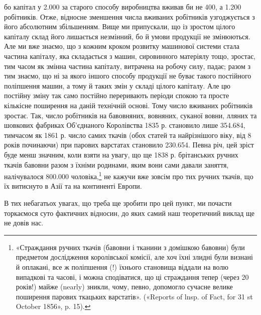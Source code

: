 \parcont{}  %
бо капітал у 2.000 за старого способу виробництва
вживав би не 400, а 1.200 робітників. Отже, відносне зменшення
числа вживаних робітників узгоджується з його абсолютним
збільшенням. Вище ми припускали, що із зростом цілого
капіталу склад його лишається незмінний, бо й умови продукції
не змінюються. Але ми вже знаємо, що з кожним кроком розвитку
машинової системи стала частина капіталу, яка складається з
машин, сировинного матеріялу тощо, зростає, тим часом як
змінна частина капіталу, витрачена на робочу силу, падає; разом
з тим знаємо, що ні за якого іншого способу продукції не буває
такого постійного поліпшення машин, а тому й таких змін у
складі цілого капіталу. Але цю постійну зміну так само постійно
переривають періоди спокою та просте кількісне поширення на
даній технічній основі. Тому число вживаних робітників зростає.
Так, число робітників на бавовняних, вовняних, суканої вовни,
лляних та шовкових фабриках Об’єднаного Королівства 1835 р.
становило лише 354.684, тимчасом як 1861 р. число самих ткачів
(обох статей та найрізнішого віку, від 8 років починаючи) при
парових варстатах становило 230.654. Певна річ, цей зріст буде
менш значним, коли взяти на увагу, що ще 1838 р. брітанських
ручних ткачів бавовни разом з їхніми родинами, яким вони сами
давали заняття, налічувалося 800.000 чоловіка,\footnote{
«Страждання ручних ткачів (бавовни і тканини з домішкою
бавовни) були предметом дослідження королівської комісії, але хоч їхні
злидні були визнані й оплакані, все ж поліпшення (!) їхнього становища
віддали на волю випадкові та часові, і можна сподіватися, що ці страждання
тепер (через 20 років!) майже (nearly) зникли, чому, певно, допомогло
сучасне велике поширення парових ткацьких варстатів». («Reports
of lnsp. of Fact, for 31 st October 1856», p. 15).
} не кажучи вже
зовсім про тих ручних ткачів, що їх витиснуто в Азії та на континенті
Европи.

В тих небагатьох увагах, що треба ще зробити про цей пункт,
ми почасти торкаємося суто фактичних відносин, до яких самий
наш теоретичний виклад ще не довів нас.

